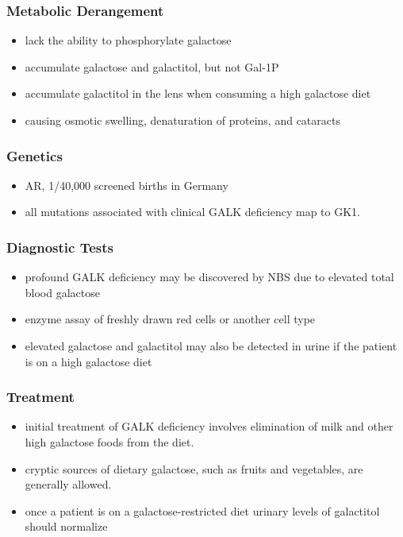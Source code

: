 \documentclass{scrartcl}
\begin{document}
\subsubsection{Metabolic Derangement}
\label{sec:orgddabdb2}
\begin{itemize}
\item lack the ability to phosphorylate galactose
\item accumulate galactose and galactitol, but not Gal-1P
\item accumulate galactitol in the lens when consuming a high galactose diet
\item causing osmotic swelling, denaturation of proteins, and cataracts
\end{itemize}

\subsubsection{Genetics}
\label{sec:org24b6de4}
\begin{itemize}
\item AR, 1/40,000 screened births in Germany
\item all mutations associated with clinical GALK deficiency map to GK1.
\end{itemize}

\subsubsection{Diagnostic Tests}
\label{sec:org62403f5}
\begin{itemize}
\item profound GALK deficiency may be discovered by NBS due to elevated total blood galactose
\item enzyme assay of freshly drawn red cells or another cell type
\item elevated galactose and galactitol may also be detected in urine if
the patient is on a high galactose diet
\end{itemize}

\subsubsection{Treatment}
\label{sec:org70510d0}
\begin{itemize}
\item initial treatment of GALK deficiency involves elimination of milk and other high galactose foods from the diet.
\item cryptic sources of dietary galactose, such as fruits and vegetables, are generally allowed.
\item once a patient is on a galactose-restricted diet urinary levels of galactitol should normalize
\end{itemize}
\end{document}
